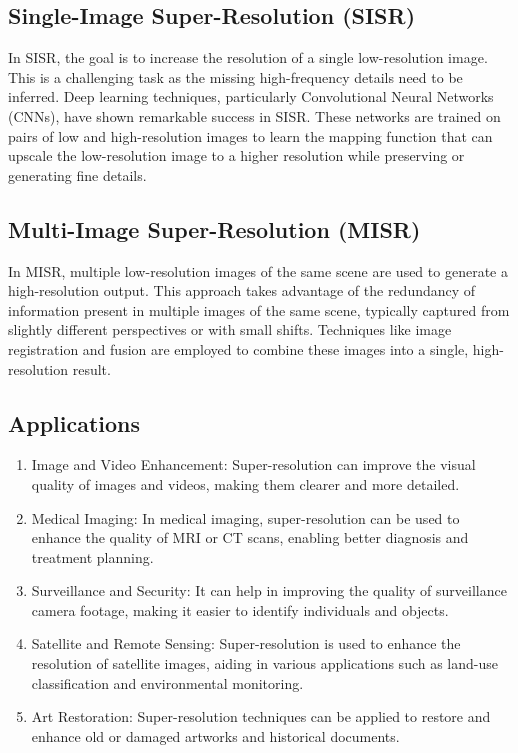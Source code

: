 \documentclass[10pt,twocolumn,letterpaper]{article}
\begin{document}
\subsection{Single-Image Super-Resolution (SISR)} In SISR, the goal is to increase the resolution of a single low-resolution image. This is a challenging task as the missing high-frequency details need to be inferred. Deep learning techniques, particularly Convolutional Neural Networks (CNNs), have shown remarkable success in SISR. These networks are trained on pairs of low and high-resolution images to learn the mapping function that can upscale the low-resolution image to a higher resolution while preserving or generating fine details.

\subsection{Multi-Image Super-Resolution (MISR)}
In MISR, multiple low-resolution images of the same scene are used to generate a high-resolution output. This approach takes advantage of the redundancy of information present in multiple images of the same scene, typically captured from slightly different perspectives or with small shifts. Techniques like image registration and fusion are employed to combine these images into a single, high-resolution result.

\subsection{Applications}
\begin{enumerate}
    \item Image and Video Enhancement: Super-resolution can improve the visual quality of images and videos, making them clearer and more detailed.
    \item Medical Imaging: In medical imaging, super-resolution can be used to enhance the quality of MRI or CT scans, enabling better diagnosis and treatment planning.
    \item Surveillance and Security: It can help in improving the quality of surveillance camera footage, making it easier to identify individuals and objects.
    \item Satellite and Remote Sensing: Super-resolution is used to enhance the resolution of satellite images, aiding in various applications such as land-use classification and environmental monitoring.
    \item Art Restoration: Super-resolution techniques can be applied to restore and enhance old or damaged artworks and historical documents.
\end{enumerate}
\end{document}
